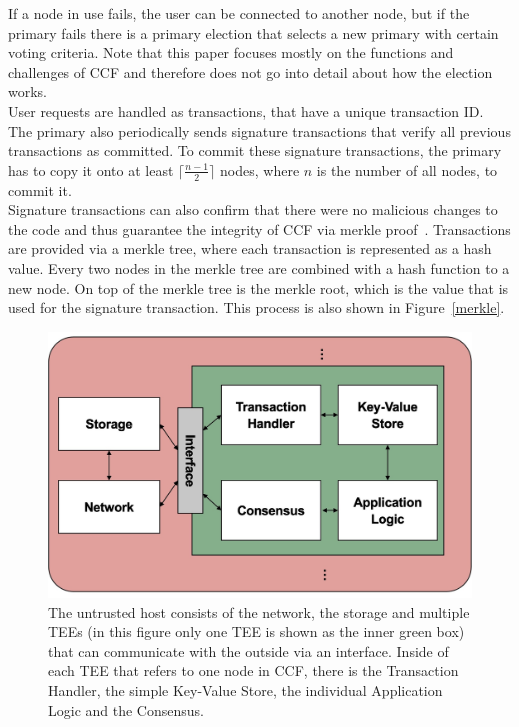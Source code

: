  If a node in use fails, the user can be connected to another node, but if the primary fails there is a primary election that selects a new primary with certain voting criteria. Note that this paper focuses mostly on the functions and challenges of CCF and therefore does not go into detail about how the election works. \\
 User requests are handled as transactions, that have a unique transaction ID. The primary also periodically sends signature transactions that verify all previous transactions as committed. To commit these signature transactions, the primary has to copy it onto at least $\lceil\frac{n-1}{2}\rceil$ nodes, where $n$ is the number of all nodes, to commit it.\\
  Signature transactions can also confirm that there were no malicious changes to the code and thus guarantee the integrity of CCF via merkle proof~\cite{merkle}. Transactions are provided via a merkle tree, where each transaction is represented as a hash value. Every two nodes in the merkle tree are combined with a hash function to a new node. On top of the merkle tree is the merkle root, which is the value that is used for the signature transaction. This process is also shown in Figure~\ref{merkle}.\\
  
  \begin{figure}[t]
	\includegraphics[scale=0.14]{pictures/ccf}
	\caption{The untrusted host consists of the network,  the storage and multiple TEEs (in this figure only one TEE is shown as the inner green box) that can communicate with the outside via an interface. Inside of each TEE that refers to one node in CCF, there is the Transaction Handler, the simple Key-Value Store, the individual Application Logic and the Consensus.}
	\label{ccf}
\end{figure}
  
